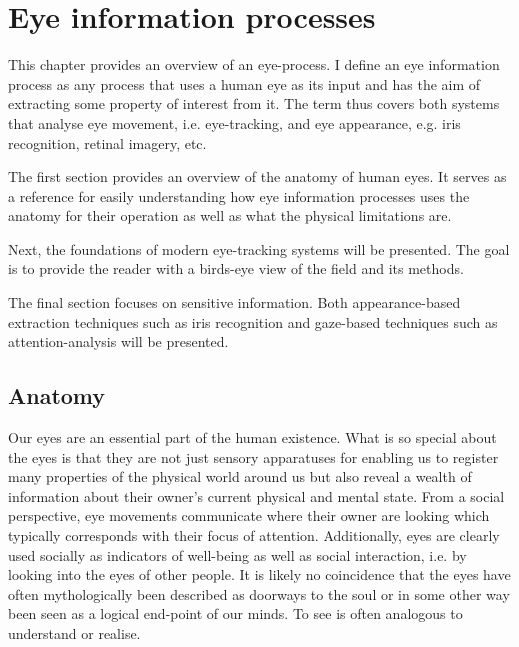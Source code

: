 \chapter{Eye information processes}
This chapter provides an overview of an \gls{eye-process}. I define an eye information process as any process that uses a human eye as its input and has the aim of extracting some property of interest from it. The term thus covers both systems that analyse eye movement, i.e. eye-tracking, and eye appearance, e.g. iris recognition, retinal imagery, etc. 

The first section provides an overview of the anatomy of human eyes. It serves as a reference for easily understanding how eye information processes uses the anatomy for their operation as well as what the physical limitations are. 

Next, the foundations of modern eye-tracking systems will be presented. The goal is to provide the reader with a birds-eye view of the field and its methods.

The final section focuses on sensitive information. Both appearance-based extraction techniques such as iris recognition and gaze-based techniques such as attention-analysis will be presented. 


\section{Anatomy}
Our eyes are an essential part of the human existence. What is so special about the eyes is that they are not just sensory apparatuses for enabling us to register many properties of the physical world around us but also reveal a wealth of information about their owner's current physical and mental state. From a social perspective, eye movements communicate where their owner are looking which typically corresponds with their focus of attention. Additionally, eyes are clearly used socially as indicators of well-being as well as social interaction, i.e. by looking into the eyes of other people. It is likely no coincidence that the eyes have often mythologically been described as doorways to the soul or in some other way been seen as a logical end-point of our minds. To see is often analogous to understand or realise. 

